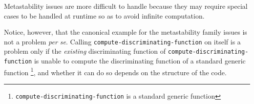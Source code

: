 Metastability issues are more difficult to handle because they may
require special cases to be handled at runtime so as to avoid infinite
computation.  

Notice, however, that the canonical example for the
metastability family issues is not a problem \emph{per se}.  Calling
\texttt{compute-discriminating-function} on itself is a problem only
if the \emph{existing} discriminating function of
\texttt{compute-discriminating-function} is unable to compute the
discriminating function of a standard generic function%
\footnote{\texttt{compute-discriminating-function} is a standard
  generic function}, and whether it can do so depends on the structure
of the code.

